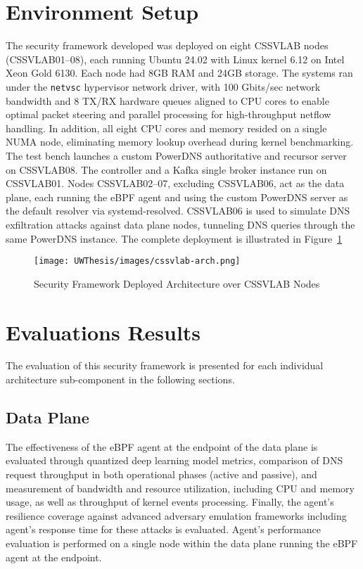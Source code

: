 \documentclass [11pt, proquest] {uwthesis}[2020/02/24]
\begin{document}
\section{Environment Setup}
The security framework developed was deployed on eight CSSVLAB nodes (CSSVLAB{01–08}), each running Ubuntu 24.02 with Linux kernel 6.12 on Intel Xeon Gold 6130. Each node had 8GB RAM and 24GB storage. The systems ran under the \texttt{netvsc} hypervisor network driver, with 100 Gbits/sec network bandwidth and 8 TX/RX hardware queues aligned to CPU cores to enable optimal packet steering and parallel processing for high-throughput netflow handling. In addition, all eight CPU cores and memory resided on a single NUMA node, eliminating memory lookup overhead during kernel benchmarking. The test bench launches a custom PowerDNS authoritative and recursor server on CSSVLAB08. The controller and a Kafka single broker instance run on CSSVLAB01. Nodes CSSVLAB{02–07}, excluding CSSVLAB06, act as the data plane, each running the eBPF agent and using the custom PowerDNS server as the default resolver via systemd-resolved. CSSVLAB06 is used to simulate DNS exfiltration attacks against data plane nodes, tunneling DNS queries through the same PowerDNS instance. The complete deployment is illustrated in Figure~\ref{fig:deployed-arch}


\begin{figure}[h]
\centering
\texttt{[image: UWThesis/images/cssvlab-arch.png]}
\caption{Security Framework Deployed Architecture over CSSVLAB Nodes}
\label{fig:deployed-arch}
\end{figure}

\section{Evaluations Results}
The evaluation of this security framework is presented for each individual architecture sub-component in the following sections.

\subsection{Data Plane}
The effectiveness of the eBPF agent at the endpoint of the data plane is evaluated through quantized deep learning model metrics, comparison of DNS request throughput in both operational phases (active and passive), and measurement of bandwidth and resource utilization, including CPU and memory usage, as well as throughput of kernel events processing. Finally, the agent’s resilience coverage against advanced adversary emulation frameworks including agent's response time for these attacks is evaluated. Agent's performance evaluation is performed on a single node within the data plane running the eBPF agent at the endpoint.
\end{document}
